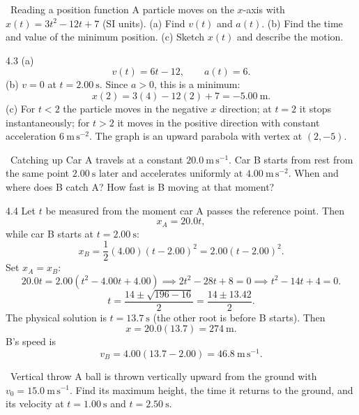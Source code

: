 \begin{exercise}{\warm\ Reading a position function}
A particle moves on the $x$-axis with $x(t)=3t^2-12t+7$ (SI units).
(a) Find $v(t)$ and $a(t)$.
(b) Find the time and value of the minimum position.
(c) Sketch $x(t)$ and describe the motion.
\end{exercise}

\begin{tabletworkspace}[6.5cm]
\end{tabletworkspace}

\begin{solution}{4.3}
(a)
\[
v(t)=6t-12,\qquad a(t)=6.
\]
(b) $v=0$ at $t=2.00\ \mathrm{s}$. Since $a>0$, this is a minimum:
\[
x(2)=3(4)-12(2)+7=-5.00\ \mathrm{m}.
\]
(c) For $t<2$ the particle moves in the negative $x$ direction; at $t=2$ it
stops instantaneously; for $t>2$ it moves in the positive direction with constant
acceleration $6\ \mathrm{m\,s^{-2}}$. The graph is an upward parabola with vertex
at $(2,-5)$.
\end{solution}

\begin{exercise}{\core\ Catching up}
Car A travels at a constant $20.0\ \mathrm{m\,s^{-1}}$. Car B starts from rest
from the same point $2.00\ \mathrm{s}$ later and accelerates uniformly at
$4.00\ \mathrm{m\,s^{-2}}$. When and where does B catch A? How fast is B moving
at that moment?
\end{exercise}

\begin{tabletworkspace}[6.5cm]
\end{tabletworkspace}

\begin{solution}{4.4}
Let $t$ be measured from the moment car A passes the reference point. Then
\[
x_A=20.0t,
\]
while car B starts at $t=2.00\ \mathrm{s}$:
\[
x_B=\frac12(4.00)(t-2.00)^2=2.00(t-2.00)^2.
\]
Set $x_A=x_B$:
\[
20.0t=2.00(t^2-4.00t+4.00)
\implies
2t^2-28t+8=0
\implies
t^2-14t+4=0.
\]
\[
t=\frac{14\pm\sqrt{196-16}}{2}=\frac{14\pm13.42}{2}.
\]
The physical solution is $t=13.7\ \mathrm{s}$ (the other root is before B starts).
Then
\[
x=20.0(13.7)=274\ \mathrm{m}.
\]
B's speed is
\[
v_B=4.00(13.7-2.00)=46.8\ \mathrm{m\,s^{-1}}.
\]
\end{solution}

\begin{exercise}{\core\ Vertical throw}
A ball is thrown vertically upward from the ground with
$v_0=15.0\ \mathrm{m\,s^{-1}}$. Find its maximum height, the time it returns to
the ground, and its velocity at $t=1.00\ \mathrm{s}$ and $t=2.50\ \mathrm{s}$.
\end{exercise}

